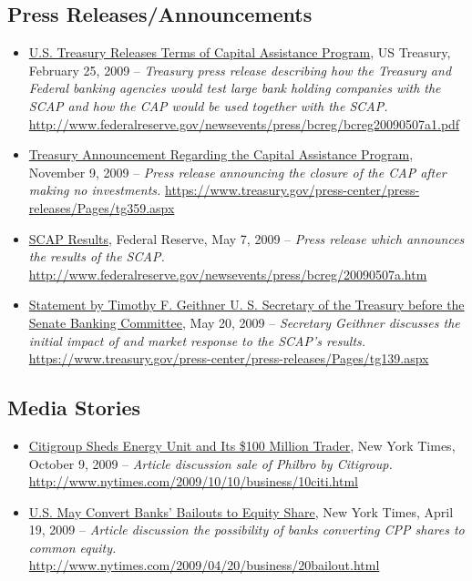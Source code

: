 \documentclass[12pt]{article}
\begin{document}
\subsection{Press Releases/Announcements}

\begin{itemize}
\item
\ul{U.S. Treasury Releases Terms of Capital Assistance Program}, US Treasury, February 25, 2009 -- \emph{Treasury press release describing how the Treasury and Federal banking agencies would test large bank holding companies with the SCAP and how the CAP would be used together with the SCAP.} \url{http://www.federalreserve.gov/newsevents/press/bcreg/bcreg20090507a1.pdf}
\item
\ul{ Treasury Announcement Regarding the Capital Assistance Program}, November 9, 2009 -- \emph{Press release announcing the closure of the CAP after making no investments.} \url{https://www.treasury.gov/press-center/press-releases/Pages/tg359.aspx}
\item
\ul{SCAP
  Results}, Federal Reserve, May 7, 2009 -- \emph{Press release which
  announces the results of the SCAP.} \url{http://www.federalreserve.gov/newsevents/press/bcreg/20090507a.htm}
\item
\ul{Statement
  by Timothy F. Geithner U. S. Secretary of the Treasury before the
  Senate Banking Committee}, May 20, 2009 -- \emph{Secretary Geithner
  discusses the initial impact of and market response to the SCAP's
  results.} \url{https://www.treasury.gov/press-center/press-releases/Pages/tg139.aspx}
\end{itemize}

\subsection{Media Stories}

\begin{itemize}
\item
\ul{Citigroup Sheds Energy Unit and Its \$100 Million Trader}, New York Times, October 9,
  2009 -- \emph{Article discussion sale of Philbro by Citigroup.} \url{http://www.nytimes.com/2009/10/10/business/10citi.html}
\item
\ul{U.S. May Convert Banks' Bailouts to Equity Share}, New York Times, April 19,
  2009 -- \emph{Article discussion the possibility of banks converting CPP shares to common equity.} \url{http://www.nytimes.com/2009/04/20/business/20bailout.html}
\end{itemize}
\end{document}
